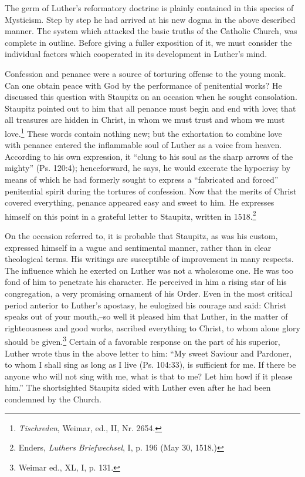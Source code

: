 The germ of Luther’s reformatory doctrine is plainly contained
in this species of Mysticism. Step by step he had arrived at his new
dogma in the above described manner. The system which attacked
the basic truths of the Catholic Church, was complete in outline.
Before giving a fuller exposition of it, we must consider the individual
factors which cooperated in its development in Luther’s mind.

Confession and penance were a source of torturing offense to the
young monk. Can one obtain peace with God by the performance
of penitential works? He discussed this question with Staupitz on an
occasion when he sought consolation. Staupitz pointed out to him that
all penance must begin and end with love; that all treasures are
hidden in Christ, in whom we must trust and whom we must love.\footnote
{\textit{Tischreden}, Weimar, ed., II, Nr. 2654.}
These words contain nothing new; but the exhortation to combine
love with penance entered the inflammable soul of Luther as a voice
from heaven. According to his own expression, it
“clung to his soul as the sharp arrows of the mighty” (Ps. 120:4);
henceforward, he says, he would execrate the hypocrisy by means of which he had
formerly sought to express a “fabricated and forced” penitential
spirit during the tortures of confession. Now that the merits
of Christ covered everything, penance appeared easy and sweet
to him. He expresses himself on this point in a grateful letter to
Staupitz, written in 1518.\footnote
{Enders, \textit{Luthers Briefwechsel}, I, p. 196 (May 30, 1518.)}

On the occasion referred to, it is probable that Staupitz, as was
his custom, expressed himself in a vague and sentimental manner,
rather than in clear theological terms. His writings are susceptible of
improvement in many respects. The influence which he exerted on
Luther was not a wholesome one. He was too fond of him to penetrate
his character. He perceived in him a rising star of his congregation,
a very promising ornament of his Order. Even in the most
critical period anterior to Luther’s apostasy, he eulogized his courage
and said: Christ speaks out of your mouth,--so well it pleased him
that Luther, in the matter of righteousness and good works, ascribed
everything to Christ, to whom alone glory should be given.\footnote{Weimar ed., XL, I, p. 131.}
Certain of a favorable response on the part of his superior, Luther wrote thus
in the above letter to him: “My sweet Saviour and Pardoner, to whom I
shall sing as long as I live (Ps. 104:33),
is sufficient for me. If there
be anyone who will not sing with me, what is that to me? Let him
howl if it please him.” The shortsighted Staupitz sided with Luther
even after he had been condemned by the Church.

